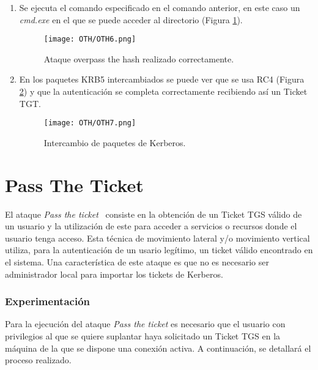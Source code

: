 \begin{enumerate}
\item Se ejecuta el comando especificado en el comando anterior, en este caso un {\it cmd.exe} en el que se puede acceder al directorio (Figura \ref{OTH6}).
\begin{figure}[H] %
\begin{center}
\texttt{[image: OTH/OTH6.png]}
\end{center}
\caption{Ataque overpass the hash realizado correctamente.}
\label{OTH6}
\end{figure}

\item En los paquetes KRB5 intercambiados se puede ver que se usa RC4 (Figura \ref{OTH7}) y que la autenticación se completa correctamente recibiendo así un Ticket TGT. 
\begin{figure}[H] %
\begin{center}
\texttt{[image: OTH/OTH7.png]}
\end{center}
\caption{Intercambio de paquetes de Kerberos.}
\label{OTH7}
\end{figure}


\end{enumerate}

\section{Pass The Ticket}

El ataque {\it Pass the ticket}~\cite{Capitulo5:ptt} consiste en la obtención de un Ticket TGS válido de un usuario y la utilización de este para acceder a servicios o recursos donde el usuario tenga acceso. Esta técnica de movimiento lateral y/o movimiento vertical utiliza, para la autenticación de un usario legítimo, un ticket válido encontrado en el sistema. Una característica de este ataque es que no es necesario ser administrador local para importar los tickets de Kerberos.  

\subsubsection{Experimentación}

Para la ejecución del ataque {\it Pass the ticket} es necesario que el usuario con privilegios al que se quiere suplantar haya solicitado un Ticket TGS en la máquina de la que se dispone una conexión activa. A continuación, se detallará el proceso realizado. 

